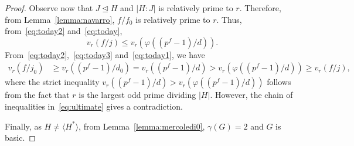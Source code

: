 \documentclass[10pt,a4paper]{amsart}
\begin{document}
\begin{proof}
Observe now that $J\unlhd H$ and $|H:J|$ is relatively prime to  $r$. Therefore, from Lemma~\ref{lemma:navarro}, $f/f_0$ is relatively prime to $r$. Thus, from~\eqref{eq:today2} and~\eqref{eq:today}, 
\begin{equation}\label{eq:today1}
v_r(f/j)\le v_r(\varphi((p^f-1)/d)).
\end{equation}
From~\eqref{eq:today2},~\eqref{eq:today3} and~\eqref{eq:today1}, we have
\begin{align}\label{eq:ultimate}
v_r(f/j_0)&\ge v_r((p^f-1)/d_0)=v_r((p^f-1)/d)>v_r(\varphi((p^f-1)/d))\ge v_r(f/j),
\end{align}
where the strict inequality 
$v_r((p^f-1)/d)>v_r(\varphi((p^f-1)/d))$
follows from the fact that $r$ is the largest odd prime dividing $|H|$. However, the chain of inequalities in~\eqref{eq:ultimate} gives a contradiction.

Finally, as $H\ne \langle H^\ast\rangle$, from Lemma~\ref{lemma:mercoledi0}, $\gamma(G)=2$ and $G$ is basic.
\end{proof}
\end{document}
